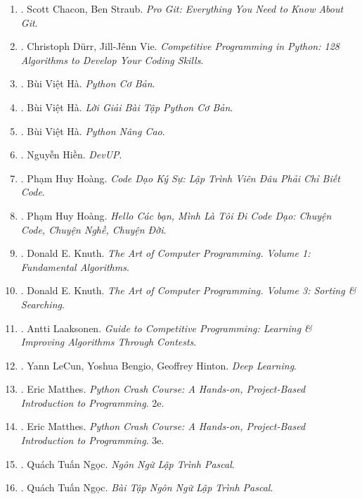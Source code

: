 \documentclass{article}
\begin{document}
\begin{enumerate}
	\item \cite{Chacon_Straub2014}. Scott Chacon, Ben Straub. {\it Pro Git: Everything You Need to Know About Git}.\hfill{\sf[reading]}
	\item \cite{Durr_Vie2021}. Christoph D\"urr, Jill-J\^enn Vie. {\it Competitive Programming in Python: 128 Algorithms to Develop Your Coding Skills}.
	\item \cite{Ha_Python_co_ban}. Bùi Việt Hà. {\it Python Cơ Bản}.\hfill{\sf[done]}
	\item \cite{Ha_loi_giai_BT_Python_co_ban}. Bùi Việt Hà. {\it Lời Giải Bài Tập Python Cơ Bản}.\hfill{\sf[reading]}
	\item \cite{Ha_Python_nang_cao}. Bùi Việt Hà. {\it Python Nâng Cao}.\hfill{\sf[done]}
	\item \cite{Hien_DevUp}. Nguyễn Hiền. {\it DevUP}.\hfill{\sf[done]}
	\item \cite{Hoang_code_dao_ky_su}. Phạm Huy Hoàng. {\it Code Dạo Ký Sự: Lập Trình Viên Đâu Phải Chỉ Biết Code}.\hfill{\sf[done]}
	\item \cite{Hoang_toi_di_code_dao}. Phạm Huy Hoàng. {\it Hello Các bạn, Mình Là Tôi Đi Code Dạo: Chuyện Code, Chuyện Nghề, Chuyện Đời}.\hfill{\sf[done]}
	\item \cite{Knuth1997}. Donald E. Knuth. {\it The Art of Computer Programming. Volume 1: Fundamental Algorithms}.\hfill{\sf[reading]}
	\item \cite{Knuth1998}. Donald E. Knuth. {\it The Art of Computer Programming. Volume 3: Sorting \& Searching}.\hfill{\sf[reading]}
	\item \cite{Laaksonen2020}. Antti Laaksonen. {\it Guide to Competitive Programming: Learning \& Improving Algorithms Through Contests}.\hfill{\sf[reading]}
	\item \cite{LeCun_Bengio_Hinton2015}. Yann LeCun, Yoshua Bengio, Geoffrey Hinton. {\it Deep Learning}.\hfill{\sf[reading]}
	\item \cite{Matthes2019}. Eric Matthes. {\it Python Crash Course: A Hands-on, Project-Based Introduction to Programming}. 2e.\hfill{\sf[reading]}
	\item \cite{Matthes2023}. Eric Matthes. {\it Python Crash Course: A Hands-on, Project-Based Introduction to Programming}. 3e.\hfill{\sf[reading]}
	\item \cite{Ngoc_Pascal}. Quách Tuấn Ngọc. {\it Ngôn Ngữ Lập Trình Pascal}.\hfill{\sf[reading]}
	\item \cite{Ngoc_BT_Pascal}. Quách Tuấn Ngọc. {\it Bài Tập Ngôn Ngữ Lập Trình Pascal}.\hfill{\sf[reading]}

\end{enumerate}
\end{document}
